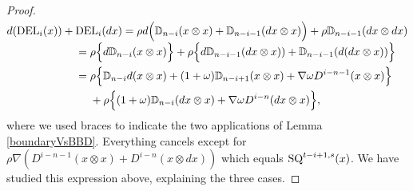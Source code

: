 \documentclass[11pt]{amsart} \renewcommand{\baselinestretch}{1.4}
\theoremstyle{plain}
\theoremstyle{definition}
\newcommand{\twist}{\omega}
\newcommand{\Nabla}{\nabla}
\begin{document}
\begin{second quadrant homotopy sseq operations}
\begin{proof}
\begin{alignat*}{2}
d(\textup{DEL}_i(x))+{}& \textup{DEL}_i(dx)
=
\smash{\rho d\Bigl(\mathbb{D}_{n-i}(x\otimes x)+\mathbb{D}_{n-i-1}(dx\otimes x)\Bigr)}+\rho\mathbb{D}_{n-i-1}(dx\otimes dx)%
\\
&=
\rho\Bigl\{d\mathbb{D}_{n-i}(x\otimes x)\Bigr\}+\rho\Bigl\{d\mathbb{D}_{n-i-1}(dx\otimes x))+\mathbb{D}_{n-i-1}(d(dx\otimes x))\Bigr\}%
\\
&=
\rho\Bigl\{\mathbb{D}_{n-i}d(x\otimes x)+(1+\twist)\mathbb{D}_{n-i+1}(x\otimes x)+\Nabla\twist D^{i-n-1}(x\otimes x)\Bigr\}
\\
&\ \ \ \ +\rho\Bigl\{(1+\twist)\mathbb{D}_{n-i}(dx\otimes x)+\Nabla\twist D^{i-n}(dx\otimes x)\Bigr\},
\end{alignat*}
where we used braces to indicate the two applications of Lemma \ref{boundaryVsBBD}.
Everything cancels except for $\rho\Nabla(D^{i-n-1}(x\otimes x)+D^{i-n}(x\otimes dx))$ which equals $\textup{SQ}^{t-i+1,s}(x)$. We have studied this expression above, explaining the three cases.


\end{proof}
\end{second quadrant homotopy sseq operations}
\end{document}
